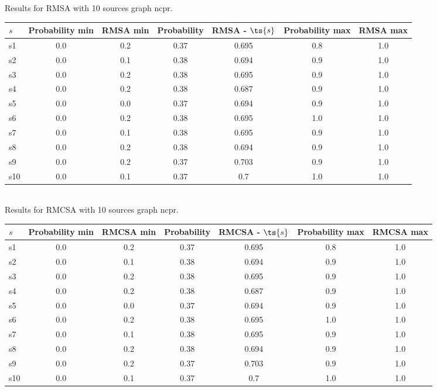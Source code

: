 \documentclass{article}
\begin{document}
\noindent Results for RMSA with 10 sources graph ncpr.

\noindent\begin{tabular}{|l|c|c|c|c|c|c|}
\hline
$s$& Probability min & RMSA min & Probability & RMSA - $\ts{s}$ & Probability max & RMSA max\\
\hline
s1 &0.0 & 0.2 & 0.37 & 0.695 & 0.8 & 1.0\\
\hline
s2 &0.0 & 0.1 & 0.38 & 0.694 & 0.9 & 1.0\\
\hline
s3 &0.0 & 0.2 & 0.38 & 0.695 & 0.9 & 1.0\\
\hline
s4 &0.0 & 0.2 & 0.38 & 0.687 & 0.9 & 1.0\\
\hline
s5 &0.0 & 0.0 & 0.37 & 0.694 & 0.9 & 1.0\\
\hline
s6 &0.0 & 0.2 & 0.38 & 0.695 & 1.0 & 1.0\\
\hline
s7 &0.0 & 0.1 & 0.38 & 0.695 & 0.9 & 1.0\\
\hline
s8 &0.0 & 0.2 & 0.38 & 0.694 & 0.9 & 1.0\\
\hline
s9 &0.0 & 0.2 & 0.37 & 0.703 & 0.9 & 1.0\\
\hline
s10 &0.0 & 0.1 & 0.37 & 0.7 & 1.0 & 1.0\\
\hline
\end{tabular}\\

\noindent Results for RMCSA with 10 sources graph ncpr.

\noindent\begin{tabular}{|l|c|c|c|c|c|c|}
\hline
$s$& Probability min & RMCSA min & Probability & RMCSA - $\ts{s}$ & Probability max & RMCSA max\\
\hline
s1 &0.0 & 0.2 & 0.37 & 0.695 & 0.8 & 1.0\\
\hline
s2 &0.0 & 0.1 & 0.38 & 0.694 & 0.9 & 1.0\\
\hline
s3 &0.0 & 0.2 & 0.38 & 0.695 & 0.9 & 1.0\\
\hline
s4 &0.0 & 0.2 & 0.38 & 0.687 & 0.9 & 1.0\\
\hline
s5 &0.0 & 0.0 & 0.37 & 0.694 & 0.9 & 1.0\\
\hline
s6 &0.0 & 0.2 & 0.38 & 0.695 & 1.0 & 1.0\\
\hline
s7 &0.0 & 0.1 & 0.38 & 0.695 & 0.9 & 1.0\\
\hline
s8 &0.0 & 0.2 & 0.38 & 0.694 & 0.9 & 1.0\\
\hline
s9 &0.0 & 0.2 & 0.37 & 0.703 & 0.9 & 1.0\\
\hline
s10 &0.0 & 0.1 & 0.37 & 0.7 & 1.0 & 1.0\\
\hline
\end{tabular}\\
\end{document}
